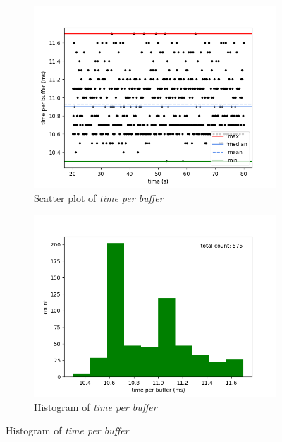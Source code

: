\begin{figure}[H]
    \centering

    \begin{subfigure}[t]{0.5\textwidth}
        \centering
        \includegraphics[scale=0.45]{img/synthetic_read_writes_wait_100us_per_buffer_scatter.png}
        \caption{Scatter plot of \textit{time per buffer}}
    \end{subfigure}%
    \begin{subfigure}[t]{0.5\textwidth}
        \centering
        \includegraphics[scale=0.45]{img/synthetic_read_writes_wait_100us_per_buffer_hist.png}
        \caption{Histogram of \textit{time per buffer}}
    \end{subfigure}


\end{figure}
